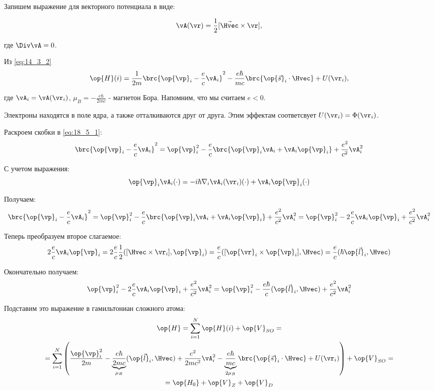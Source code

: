 Запишем выражение для векторного потенциала в виде:

$$
\vA(\vr) = \frac{1}{2}[\vec{\Hvec} \times \vr],
$$

где $\Div \vA = 0$.

Из \eqref{eq:14_3_2}
\begin{equation}
\label{eq:18_5_1}
\op{H}(i) = \frac{1}{2m}\brc{\op{\vp}_i - \frac{e}{c}\vA_i}^2 - \frac{e\hbar}{mc}\brc{\op{\vec{s}}_i \cdot \Hvec} + U(\vr_i),
\end{equation}

где $\vA_i = \vA(\vr_i)$, $\mu_B = -\frac{e\hbar}{2mc}$ - магнетон Бора. Напомним, что мы считаем $e < 0$.

Электроны находятся в поле ядра, а также отталкиваются друг от друга. Этим эффектам соответсвует $U(\vr_i) = \Phi(\vr_i)$.

Раскроем скобки в \eqref{eq:18_5_1}:
\begin{gather*}
\brc{\op{\vp}_i - \frac{e}{c}\vA_i}^2 = \op{\vp}_i^2 - \frac{e}{c}\brc{\op{\vp}_i \vA_i + \vA_i \op{\vp}_i} + \frac{e^2}{c^2}\vA_i^2 
\end{gather*}

С учетом выражения:
$$
\op{\vp}_i \vA_i (\cdot) = -i\hbar \nabla_i \vA_i(\vr_i)(\cdot) + \vA_i \op{\vp}_i(\cdot)
$$

Получаем:
\begin{gather*}
\brc{\op{\vp}_i - \frac{e}{c}\vA_i}^2 = \op{\vp}_i^2 - \frac{e}{c}\brc{\op{\vp}_i \vA_i + \vA_i \op{\vp}_i} + \frac{e^2}{c^2}\vA_i^2 = \op{\vp}_i^2 - 2\frac{e}{c}\vA_i \op{\vp}_i + \frac{e^2}{c^2}\vA_i^2
\end{gather*}

Теперь преобразуем второе слагаемое:
$$
2\frac{e}{c}\vA_i \op{\vp}_i = 2\frac{e}{c} \frac{1}{2}([\Hvec \times \vr_i], \op{\vp}_i) = \frac{e}{c}([\op{\vr}_i \times \op{\vp}_i], \Hvec) =\frac{e}{c}(\hbar \op{\vec{l}}_i, \Hvec)   
$$

Окончательно получаем:
\begin{gather*}
\op{\vp}_i^2 - 2\frac{e}{c}\vA_i \op{\vp}_i + \frac{e^2}{c^2}\vA_i^2 = \op{\vp}_i^2 - \frac{e\hbar}{c}(\op{\vec{l}}_i, \Hvec) + \frac{e^2}{c^2}\vA_i^2
\end{gather*}

Подставим это выражение в гамильтониан сложного атома:
\begin{gather}
\label{eq:18_5_2}
\op{H} = \sum_{i=1}^N \op{H}(i) + \op{V}_{SO} =  \nonumber \\
= \sum_{i=1}^N \left ( {\frac{\op{\vp}_i^2}{2m} - \underbrace{\frac{e\hbar}{2mc}}_{\mu_B}(\op{\vec{l}}_i, \Hvec) + \frac{e^2}{2mc^2}\vA_i^2 - \underbrace{\frac{e\hbar}{mc}}_{2\mu_B}\brc{\op{\vec{s}}_i \cdot \Hvec}} + U(\vr_i) \right ) + \op{V}_{SO} =  \nonumber \\ 
= \op{H_0} + \op{V}_Z +\op{V}_D
\end{gather}

